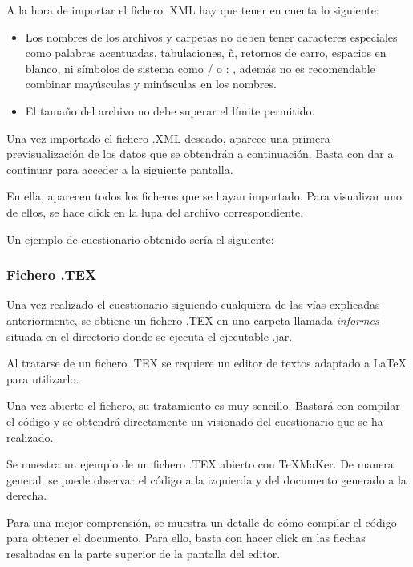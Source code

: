 A la hora de importar el fichero .XML hay que tener en cuenta lo siguiente:
\begin{itemize}
\item Los nombres de los archivos y carpetas no deben tener caracteres especiales como palabras acentuadas, tabulaciones, ñ, retornos de carro, espacios en blanco, ni símbolos de sistema como / o : , además no es recomendable combinar mayúsculas y minúsculas en los nombres.
\item El tamaño del archivo no debe superar el límite permitido.

\end{itemize} 

Una vez importado el fichero .XML deseado, aparece una primera previsualización de los datos que se obtendrán a continuación. Basta con dar a continuar para acceder a la siguiente pantalla.

En ella, aparecen todos los ficheros que se hayan importado. Para visualizar uno de ellos, se hace click en la lupa del archivo correspondiente.

Un ejemplo de cuestionario obtenido sería el siguiente:

\subsubsection{Fichero .TEX}

Una vez realizado el cuestionario siguiendo cualquiera de las vías explicadas anteriormente, se obtiene un fichero .TEX en una carpeta llamada \textit{informes} situada en el directorio donde se ejecuta el ejecutable .jar.

Al tratarse de un fichero .TEX se requiere un editor de textos adaptado a \LaTeX{} para utilizarlo.

Una vez abierto el fichero, su tratamiento es muy sencillo. Bastará con compilar el código y se obtendrá directamente un visionado del cuestionario que se ha realizado.

Se muestra un ejemplo de un fichero .TEX abierto con \TeX{}MaKer. De manera general, se puede observar el código a la izquierda y del documento generado a la derecha.


Para una mejor comprensión, se muestra un detalle de cómo compilar el código para obtener el documento. Para ello, basta con hacer click en las flechas resaltadas en la parte superior de la pantalla del editor.

